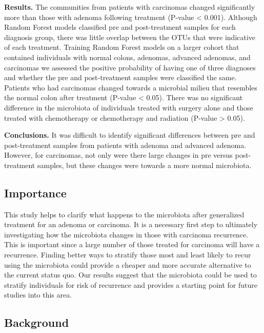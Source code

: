 \documentclass[12pt,]{article}
\begin{document}
\textbf{Results.} The communities from patients with carcinomas changed
significantly more than those with adenoma following treatment (P-value
\textless{} 0.001). Although Random Forest models classified pre and
post-treatment samples for each diagnosis group, there was little
overlap between the OTUs that were indicative of each treatment.
Training Random Forest models on a larger cohort that contained
individuals with normal colons, adenomas, advanced adenomas, and
carcinomas we assessed the positive probability of having one of three
diagnoses and whether the pre and post-treatment samples were classified
the same. Patients who had carcinomas changed towards a microbial milieu
that resembles the normal colon after treatment (P-value \textless{}
0.05). There was no significant difference in the microbiota of
individuals treated with surgery alone and those treated with
chemotherapy or chemotherapy and radiation (P-value \textgreater{}
0.05).

\textbf{Conclusions.} It was difficult to identify significant
differences between pre and post-treatment samples from patients with
adenoma and advanced adenoma. However, for carcinomas, not only were
there large changes in pre versus post-treatment samples, but these
changes were towards a more normal microbiota.

\newpage

\subsection{Importance}\label{importance}

This study helps to clarify what happens to the microbiota after
generalized treatment for an adenoma or carcinoma. It is a necessary
first step to ultimately investigating how the microbiota changes in
those with carcinoma recurrence. This is important since a large number
of those treated for carcinoma will have a recurrence. Finding better
ways to stratify those most and least likely to recur using the
microbiota could provide a cheaper and more accurate alternative to the
current status quo. Our results suggest that the microbiota could be
used to stratify individuals for risk of recurrence and provides a
starting point for future studies into this area.

\newpage

\subsection{Background}\label{background}
\end{document}

